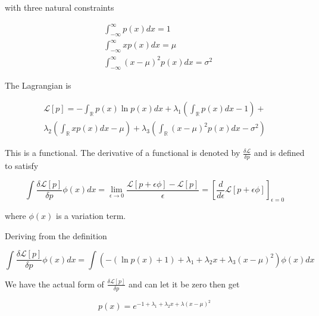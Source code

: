 \documentclass{article}
\begin{document}
            with three natural constraints

            \begin{align*}
                &\int_{-\infty}^\infty p(x) dx = 1     \\
                &\int_{-\infty}^\infty x p(x) dx = \mu \\
                &\int_{-\infty}^\infty (x-\mu)^2 p(x) dx = \sigma^2
            \end{align*}

            The Lagrangian is

            \begin{multline*}
                 \mathcal{L}[p] = -\int_{\mathbb{R}} p(x) \ln p(x) dx +
                 \lambda_1 \left( \int_{\mathbb{R}} p(x) dx - 1 \right) + \\
                 \lambda_2 \left( \int_{\mathbb{R}} x p(x) dx - \mu \right) +
                 \lambda_3 \left( \int_{\mathbb{R}} (x - \mu)^2 p(x) dx - \sigma^2 \right)
            \end{multline*}

            This is a functional. The derivative of a functional is
            denoted by $ \frac{\delta \mathcal{L}}{\delta p} $ and is defined to satisfy

            \begin{equation*}
                 \int \frac{\delta \mathcal{L}[p]}{\delta p} \phi(x) dx =
                 \lim_{\epsilon \rightarrow 0}\frac{\mathcal{L}[p + \epsilon
                 \phi] - \mathcal{L}[p]}{\epsilon} = 
                 \left[
                     \frac{d}{d \epsilon} \mathcal{L}[p + \epsilon \phi]
                 \right]_{\epsilon = 0}
            \end{equation*}

            where $ \phi(x) $ is a variation term.

            Deriving from the definition

            \begin{equation*}
                 \int \frac{\delta \mathcal{L}[p]}{\delta p} \phi(x) dx = \int 
                 \left( - ( \ln p(x) + 1 ) + \lambda_1 + \lambda_2 x +
                 \lambda_3 (x - \mu)^2 \right) \phi(x) dx
            \end{equation*}

            We have the actual form of $ \frac{\delta \mathcal{L}[p]}{\delta p} $ and can let it be zero then get

            \begin{equation*}
                 p(x) = e^{ -1 + \lambda_1 + \lambda_2 x + \lambda(x - \mu)^2 }
            \end{equation*}
\end{document}
